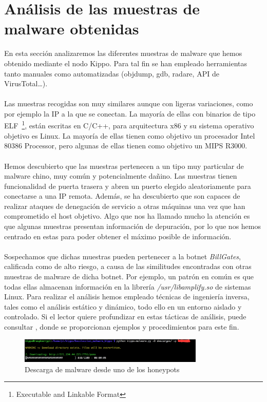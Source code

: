 \documentclass[journal]{IEEEtran}
\begin{document}
\section{Análisis de las muestras de malware obtenidas}
En esta sección analizaremos las diferentes muestras de malware que hemos obtenido mediante el nodo Kippo. Para tal fin se han empleado herramientas tanto manuales como automatizadas (objdump, gdb, radare, API de VirusTotal…).
\\\\
Las muestras recogidas son muy similares aunque con ligeras variaciones, como por ejemplo la IP a la que se conectan. La mayoría de ellas con binarios de tipo ELF~\footnote{Executable and Linkable Format}, están escritas en C/C++, para arquitectura x86 y su sistema operativo objetivo es Linux. La mayoría de ellas tienen como objetivo un procesador Intel 80386 Processor, pero algunas de ellas tienen como objetivo un MIPS R3000.
\\\\
Hemos descubierto que las muestras pertenecen a un tipo muy particular de malware chino, muy común y potencialmente dañino. Las muestras tienen funcionalidad de puerta trasera  y abren un puerto elegido aleatoriamente para conectarse a una IP remota. Además, se ha descubierto que son capaces de realizar ataques de denegación de servicio a otras máquinas una vez que han comprometido el host objetivo. Algo que nos ha llamado mucho la atención es que algunas muestras presentan información de depuración, por lo que nos hemos centrado en estas para poder obtener el máximo posible de información.
\\\\
Sospechamos que dichas muestras pueden pertenecer a la botnet \textit{BillGates}, calificada como de alto riesgo, a causa de las similitudes encontradas con otras muestras de malware de dicha botnet. Por ejemplo, un patrón en común es que todas ellas almacenan información en la librería \textit{/usr/libamplify.so} de sistemas Linux. Para realizar el análisis hemos empleado técnicas de ingeniería inversa, tales como el análisis estático y dinámico, todo ello en un entorno aislado y controlado. Si el lector quiere profundizar en estas tácticas de análisis, puede consultar \cite{know_your_enemy}, donde se proporcionan ejemplos y procedimientos para este fin.
\begin{figure}[H]
\centerline{
\includegraphics[width=8.8cm]{img/download_malware}
}
\caption{Descarga de malware desde uno de los honeypots}
\label{fig:sesion_atacante}
\end{figure}
\end{document}
